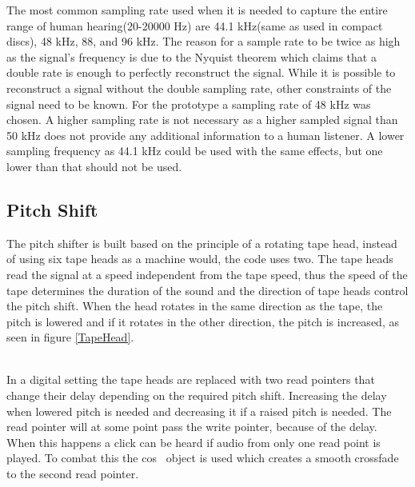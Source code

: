 The most common sampling rate used when it is needed to capture the entire range of human hearing(20-20000 Hz) are 44.1 kHz(same as used in compact discs), 48 kHz, 88, and 96 kHz. The reason for a sample rate to be twice as high as the signal’s frequency is due to the Nyquist theorem which claims that a double rate is enough to perfectly reconstruct the signal. While it is possible to reconstruct a signal without the double sampling rate, other constraints of the signal need to be known. For the prototype a sampling rate of 48 kHz was chosen. A higher sampling rate is not necessary as a higher sampled signal than 50 kHz does not provide any additional information to a human listener. A lower sampling frequency as 44.1 kHz could be used with the same effects, but one lower than that should not be used.

\subsection{Pitch Shift}

The pitch shifter is built based on the principle of a rotating tape head, instead of using six tape heads as a machine would, the code uses two\citep{Katjaas_00}. The tape heads read the signal at a speed independent from the tape speed, thus the speed of the tape determines the duration of the sound and the direction of tape heads control the pitch shift. When the head rotates in the same direction as the tape, the pitch is lowered and if it rotates in the other direction, the pitch is increased, as seen in figure \ref{TapeHead}. \\

\begin{minipage}{\linewidth}%
\label{TapeHead}
\end{minipage}\\

In a digital setting the tape heads are replaced with two read pointers that change their delay depending on the required pitch shift. Increasing the delay when lowered pitch is needed and decreasing it if a raised pitch is needed. 
The read pointer will at some point pass the write pointer, because of the delay. When this happens a click can be heard if audio from only one read point is played. To combat this the cos~ object is used which creates a smooth crossfade to the second read pointer.

